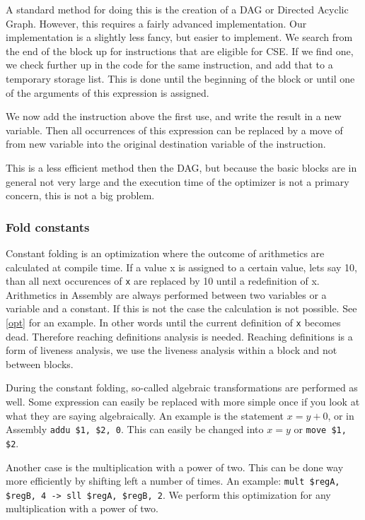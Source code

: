 \documentclass[10pt,a4paper]{article}
\begin{document}
A standard method for doing this is the creation of a DAG or Directed Acyclic
Graph. However, this requires a fairly advanced implementation. Our
implementation is a slightly less fancy, but easier to implement.
We search from the end of the block up for instructions that are eligible for
CSE. If we find one, we check further up in the code for the same instruction,
and add that to a temporary storage list. This is done until the beginning of
the block or until one of the arguments of this expression is assigned.

We now add the instruction above the first use, and write the result in a new
variable. Then all occurrences of this expression can be replaced by a move of
from new variable into the original destination variable of the instruction.

This is a less efficient method then the DAG, but because the basic blocks are
in general not very large and the execution time of the optimizer is not a
primary concern, this is not a big problem.

\subsubsection*{Fold constants}
Constant folding is an optimization where the outcome of arithmetics are
calculated at compile time. If a value x is assigned to a certain value, lets
say 10, than all next occurences of \texttt{x} are replaced by 10 until a
redefinition of x. Arithmetics in Assembly are always performed between two
variables or a variable and a constant. If this is not the case the calculation
is not possible. See \ref{opt} for an example. In other words until the current
definition of \texttt{x} becomes dead. Therefore reaching definitions analysis
is needed. Reaching definitions is a form of liveness analysis, we use the
liveness analysis within a block and not between blocks.

During the constant folding, so-called algebraic transformations are performed
as well. Some expression can easily be replaced with more simple once if you
look at what they are saying algebraically. An example is the statement
$x = y + 0$, or in Assembly \texttt{addu \$1, \$2, 0}. This can easily be
changed into $x = y$ or \texttt{move \$1, \$2}.

Another case is the multiplication with a power of two. This can be done way
more efficiently by shifting left a number of times. An example:
\texttt{mult \$regA, \$regB, 4    ->  sll  \$regA, \$regB, 2}. We perform this
optimization for any multiplication with a power of two.
\end{document}
